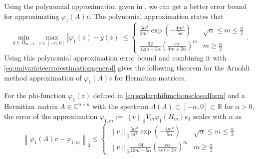 Using the polynomial approximation given in \cite[Lemma A.1]{kressner2019krylov},
we can get a better error bound for approximating $\varphi_1(A)v$.
The polynomial approximation states that
\begin{equation}
    \min_{g \in \Pi_{m-1}} \max_{z \in [-\alpha, 0]} \left|\varphi_1(z) - g(z) \right| \le
    \begin{cases}
        \frac{5\alpha^2}{2m^3} \exp \left( -\frac{4m^2}{5\alpha} \right) & \sqrt{\alpha} \le m \le \frac{\alpha}{2}
        \\
        \frac{32}{12m-5\alpha} \left( \frac{e \alpha}{4m+2\alpha} \right)^m & m \ge \frac{\alpha}{2}
    \end{cases}.
\end{equation}
Using this polynomial approximation error bound and combining it with
\eqref{eq:univariateerrorestimationgeneral} gives the following theorem for the
Arnoldi method approximation of $\varphi_1(A)v$ for Hermitian matrices.
\begin{theorem}
    \label{the:univariateerrorestimationchebyshev}
    For the phi-function $\varphi_1(z)$ defined in \eqref{eq:scalarphifunctionsclosedform}
    and a Hermitian matrix $A \in \mathbb{C}^{n \times n}$ with the spectrum
    $\Lambda(A) \subset [-\alpha, 0] \subset \mathbb{R}$ for $\alpha > 0$,
    the error of the approximation $\varphi_{1, m} := \left\| v \right\|_{2} V_m \varphi_1(H_m) e_1$
    scales with $\alpha$ as
    \begin{equation}
        \label{eq:univariateerrorestimationphi1}
        \left\| \varphi_1(A)v - \varphi_{1, m} \right\|_2 \le
        \begin{cases}
            \left\| v \right\|_2 \frac{5\alpha^2}{m^3} \exp \left( -\frac{4m^2}{5\alpha} \right)
            & \sqrt{\alpha} \le m \le \frac{\alpha}{2}
            \\
            \left\| v \right\|_2 \frac{64}{12m-5\alpha} \left( \frac{e \alpha}{4m+2\alpha} \right)^m
            & m \ge \frac{\alpha}{2}
        \end{cases}
    \end{equation}
\end{theorem}

